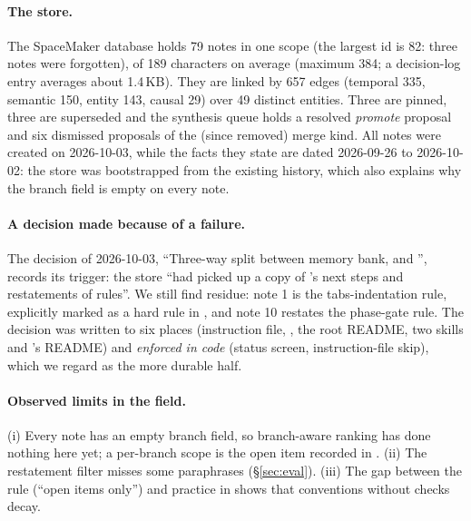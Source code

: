 \paragraph{The \jevmem{} store.} The SpaceMaker database holds 79 notes in one scope (the largest id is 82: three notes were forgotten), of 189 characters on average (maximum 384; a decision-log entry averages about 1.4\,KB). They are linked by 657 edges (temporal 335, semantic 150, entity 143, causal 29) over 49 distinct entities. Three are pinned, three are superseded and the synthesis queue holds a resolved \emph{promote} proposal and six dismissed proposals of the (since removed) merge kind. All notes were created on 2026-10-03, while the facts they state are dated 2026-09-26 to 2026-10-02: the store was bootstrapped from the existing history, which also explains why the branch field is empty on every note.

\paragraph{A decision made because of a failure.} The decision of 2026-10-03, ``Three-way split between memory bank, \jevmem{} and '', records its trigger: the store ``had picked up a copy of 's next steps and restatements of  rules''. We still find residue: note 1 is the tabs-indentation rule, explicitly marked as a hard rule in , and note 10 restates the phase-gate rule. The decision was written to six places (instruction file, , the root README, two skills and \jevmem's README) and \emph{enforced in code} (status screen, instruction-file skip), which we regard as the more durable half.

\paragraph{Observed limits in the field.} (i) Every note has an empty branch field, so branch-aware ranking has done nothing here yet; a per-branch scope is the open item recorded in . (ii) The restatement filter misses some paraphrases (\S\ref{sec:eval}). (iii) The gap between the rule (``open items only'') and practice in  shows that conventions without checks decay.

